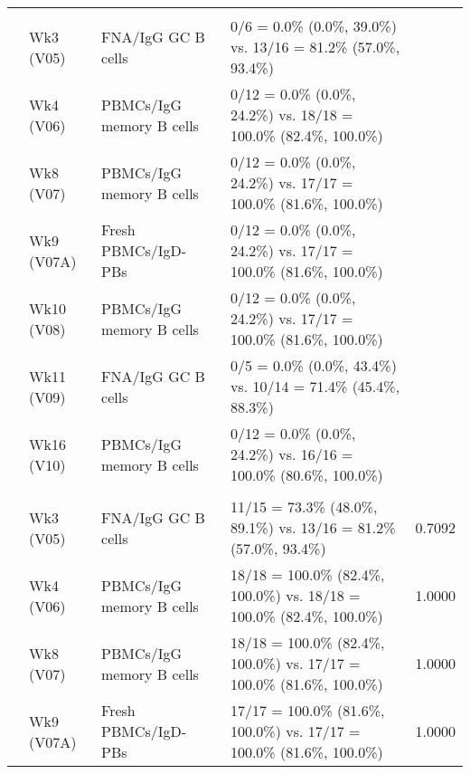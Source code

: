 \documentclass[
]{article}
\begin{document}
\begin{table}[!h]
\begin{tabular}[t]{lllll}
\cmidrule{1-5}
\addlinespace[0.3em]
\multicolumn{5}{l}{\textbf{Placebo vs. 100µg}}\\
\hspace{1em} & Wk3 (V05) & FNA/IgG GC B cells & 0/6 = 0.0\% (0.0\%, 39.0\%) vs. 13/16 = 81.2\% (57.0\%, 93.4\%) & \cellcolor{yellow}{0.0007}\\
\cmidrule{2-5}
 & Wk4 (V06) & PBMCs/IgG memory B cells & 0/12 = 0.0\% (0.0\%, 24.2\%) vs. 18/18 = 100.0\% (82.4\%, 100.0\%) & \cellcolor{yellow}{<0.0001}\\
\cmidrule{2-5}
\hspace{1em} & Wk8 (V07) & PBMCs/IgG memory B cells & 0/12 = 0.0\% (0.0\%, 24.2\%) vs. 17/17 = 100.0\% (81.6\%, 100.0\%) & \cellcolor{yellow}{<0.0001}\\
\cmidrule{2-5}
 & Wk9 (V07A) & Fresh PBMCs/IgD- PBs & 0/12 = 0.0\% (0.0\%, 24.2\%) vs. 17/17 = 100.0\% (81.6\%, 100.0\%) & \cellcolor{yellow}{<0.0001}\\
\cmidrule{2-5}
 & Wk10 (V08) & PBMCs/IgG memory B cells & 0/12 = 0.0\% (0.0\%, 24.2\%) vs. 17/17 = 100.0\% (81.6\%, 100.0\%) & \cellcolor{yellow}{<0.0001}\\
\cmidrule{2-5}
\hspace{1em} & Wk11 (V09) & FNA/IgG GC B cells & 0/5 = 0.0\% (0.0\%, 43.4\%) vs. 10/14 = 71.4\% (45.4\%, 88.3\%) & \cellcolor{yellow}{0.0059}\\
\cmidrule{2-5}
\hspace{1em} & Wk16 (V10) & PBMCs/IgG memory B cells & 0/12 = 0.0\% (0.0\%, 24.2\%) vs. 16/16 = 100.0\% (80.6\%, 100.0\%) & \cellcolor{yellow}{<0.0001}\\
\cmidrule{1-5}
\addlinespace[0.3em]
\multicolumn{5}{l}{\textbf{20µg vs. 100µg}}\\
\hspace{1em} & Wk3 (V05) & FNA/IgG GC B cells & 11/15 = 73.3\% (48.0\%, 89.1\%) vs. 13/16 = 81.2\% (57.0\%, 93.4\%) & 0.7092\\
\cmidrule{2-5}
\hspace{1em} & Wk4 (V06) & PBMCs/IgG memory B cells & 18/18 = 100.0\% (82.4\%, 100.0\%) vs. 18/18 = 100.0\% (82.4\%, 100.0\%) & 1.0000\\
\cmidrule{2-5}
\hspace{1em} & Wk8 (V07) & PBMCs/IgG memory B cells & 18/18 = 100.0\% (82.4\%, 100.0\%) vs. 17/17 = 100.0\% (81.6\%, 100.0\%) & 1.0000\\
\cmidrule{2-5}
\hspace{1em} & Wk9 (V07A) & Fresh PBMCs/IgD- PBs & 17/17 = 100.0\% (81.6\%, 100.0\%) vs. 17/17 = 100.0\% (81.6\%, 100.0\%) & 1.0000\\

\end{tabular}
\end{table}
\end{document}
